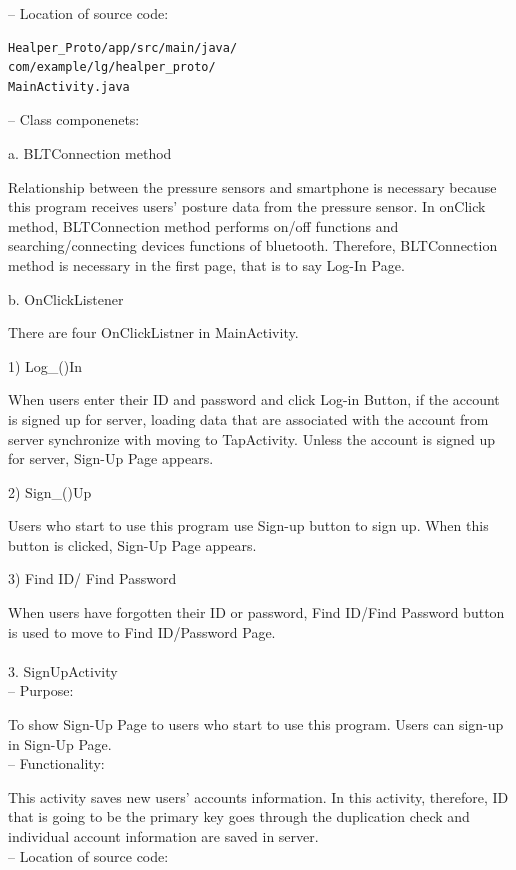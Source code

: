 \documentclass[conference]{IEEEtran}
\begin{document}
 -- Location of source code:
 
\begin{verbatim}
Healper_Proto/app/src/main/java/
com/example/lg/healper_proto/
MainActivity.java
\end{verbatim}

 -- Class componenets:

a. BLTConnection method

Relationship between the pressure sensors and smartphone is necessary because this program receives users’ posture data from the pressure sensor. In onClick method, BLTConnection method performs on/off functions and searching/connecting devices functions of bluetooth. Therefore, BLTConnection method is necessary in the first page, that is to say Log-In Page. 

b. OnClickListener

There are four OnClickListner in MainActivity.

  1) Log\_()In
  
When users enter their ID and password and click Log-in Button, if the account is signed up for server, loading data that are associated with the account from server synchronize with moving to TapActivity. Unless the account is signed up for server, Sign-Up Page appears.

  2) Sign\_()Up
  
Users who start to use this program use Sign-up button to sign up. When this button is clicked, Sign-Up Page appears.

  3) Find ID/ Find Password
  
When users have forgotten their ID or password, Find ID/Find Password button is used to move to Find ID/Password Page.\\\\

3.	SignUpActivity\\

 --	Purpose:

To show Sign-Up Page to users who start to use this program. Users can sign-up in Sign-Up Page. \\

 --	Functionality:

This activity saves new users’ accounts information. In this activity, therefore, ID that is going to be the primary key goes through the duplication check and individual account information are saved in server.\\
 
 --	Location of source code:
\end{document}
